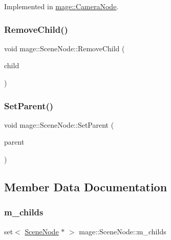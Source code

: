 Implemented in \hyperlink{classmage_1_1_camera_node_a3465efde7535f4aebe7b371f5feeae14}{mage\+::\+Camera\+Node}.

\hypertarget{classmage_1_1_scene_node_a42aa6487f21c948ab7ce6f64a57e5f11}{}\label{classmage_1_1_scene_node_a42aa6487f21c948ab7ce6f64a57e5f11} 
\subsubsection{\texorpdfstring{Remove\+Child()}{RemoveChild()}}
{\footnotesize\ttfamily void mage\+::\+Scene\+Node\+::\+Remove\+Child (\begin{DoxyParamCaption}\item[{\hyperlink{classmage_1_1_scene_node}{Scene\+Node} $\ast$}]{child }\end{DoxyParamCaption})}

\hypertarget{classmage_1_1_scene_node_a27d5219ff4c1f2b1c37899456af518ae}{}\label{classmage_1_1_scene_node_a27d5219ff4c1f2b1c37899456af518ae} 
\subsubsection{\texorpdfstring{Set\+Parent()}{SetParent()}}
{\footnotesize\ttfamily void mage\+::\+Scene\+Node\+::\+Set\+Parent (\begin{DoxyParamCaption}\item[{\hyperlink{classmage_1_1_scene_node}{Scene\+Node} $\ast$}]{parent }\end{DoxyParamCaption})\hspace{0.3cm}{\ttfamily [private]}}



\subsection{Member Data Documentation}
\hypertarget{classmage_1_1_scene_node_af3a11d9847c95d90e9dee2a2575fd92b}{}\label{classmage_1_1_scene_node_af3a11d9847c95d90e9dee2a2575fd92b} 
\subsubsection{\texorpdfstring{m\+\_\+childs}{m\_childs}}
{\footnotesize\ttfamily set$<$ \hyperlink{classmage_1_1_scene_node}{Scene\+Node} $\ast$ $>$ mage\+::\+Scene\+Node\+::m\+\_\+childs\hspace{0.3cm}{\ttfamily [private]}}

